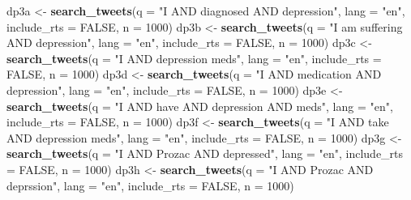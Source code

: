 \documentclass[]{article}
\newenvironment{Shaded}{\begin{snugshade}}{\end{snugshade}}
\newcommand{\DataTypeTok}[1]{\textcolor[rgb]{0.13,0.29,0.53}{#1}}
\newcommand{\DecValTok}[1]{\textcolor[rgb]{0.00,0.00,0.81}{#1}}
\newcommand{\KeywordTok}[1]{\textcolor[rgb]{0.13,0.29,0.53}{\textbf{#1}}}
\newcommand{\NormalTok}[1]{#1}
\newcommand{\OtherTok}[1]{\textcolor[rgb]{0.56,0.35,0.01}{#1}}
\newcommand{\StringTok}[1]{\textcolor[rgb]{0.31,0.60,0.02}{#1}}
\begin{document}
\begin{Shaded}
\begin{Highlighting}[]
\NormalTok{dp3a <-}\StringTok{ }\KeywordTok{search_tweets}\NormalTok{(}\DataTypeTok{q =} \StringTok{"I AND diagnosed AND depression"}\NormalTok{, }\DataTypeTok{lang =} \StringTok{"en"}\NormalTok{, }
                      \DataTypeTok{include_rts =} \OtherTok{FALSE}\NormalTok{, }\DataTypeTok{n =} \DecValTok{1000}\NormalTok{)}
\NormalTok{dp3b <-}\StringTok{ }\KeywordTok{search_tweets}\NormalTok{(}\DataTypeTok{q =} \StringTok{"I am suffering AND depression"}\NormalTok{, }\DataTypeTok{lang =} \StringTok{"en"}\NormalTok{, }
                      \DataTypeTok{include_rts =} \OtherTok{FALSE}\NormalTok{, }\DataTypeTok{n =} \DecValTok{1000}\NormalTok{)}
\NormalTok{dp3c <-}\StringTok{ }\KeywordTok{search_tweets}\NormalTok{(}\DataTypeTok{q =} \StringTok{"I AND depression meds"}\NormalTok{, }\DataTypeTok{lang =} \StringTok{"en"}\NormalTok{,}
                      \DataTypeTok{include_rts =} \OtherTok{FALSE}\NormalTok{, }\DataTypeTok{n =} \DecValTok{1000}\NormalTok{)}
\NormalTok{dp3d <-}\StringTok{ }\KeywordTok{search_tweets}\NormalTok{(}\DataTypeTok{q =} \StringTok{"I AND medication AND depression"}\NormalTok{, }\DataTypeTok{lang =} \StringTok{"en"}\NormalTok{,}
                      \DataTypeTok{include_rts =} \OtherTok{FALSE}\NormalTok{, }\DataTypeTok{n =} \DecValTok{1000}\NormalTok{)}
\NormalTok{dp3e <-}\StringTok{ }\KeywordTok{search_tweets}\NormalTok{(}\DataTypeTok{q =} \StringTok{"I AND have AND depression AND meds"}\NormalTok{, }\DataTypeTok{lang =} \StringTok{"en"}\NormalTok{,}
                      \DataTypeTok{include_rts =} \OtherTok{FALSE}\NormalTok{, }\DataTypeTok{n =} \DecValTok{1000}\NormalTok{)}
\NormalTok{dp3f <-}\StringTok{ }\KeywordTok{search_tweets}\NormalTok{(}\DataTypeTok{q =} \StringTok{"I AND take AND depression meds"}\NormalTok{, }\DataTypeTok{lang =} \StringTok{"en"}\NormalTok{,}
                      \DataTypeTok{include_rts =} \OtherTok{FALSE}\NormalTok{, }\DataTypeTok{n =} \DecValTok{1000}\NormalTok{)}
\NormalTok{dp3g <-}\StringTok{ }\KeywordTok{search_tweets}\NormalTok{(}\DataTypeTok{q =} \StringTok{"I AND Prozac AND depressed"}\NormalTok{, }\DataTypeTok{lang =} \StringTok{"en"}\NormalTok{,}
                      \DataTypeTok{include_rts =} \OtherTok{FALSE}\NormalTok{, }\DataTypeTok{n =} \DecValTok{1000}\NormalTok{)}
\NormalTok{dp3h <-}\StringTok{ }\KeywordTok{search_tweets}\NormalTok{(}\DataTypeTok{q =} \StringTok{"I AND Prozac AND deprssion"}\NormalTok{, }\DataTypeTok{lang =} \StringTok{"en"}\NormalTok{,}
                      \DataTypeTok{include_rts =} \OtherTok{FALSE}\NormalTok{, }\DataTypeTok{n =} \DecValTok{1000}\NormalTok{)}

\end{Highlighting}
\end{Shaded}
\end{document}
